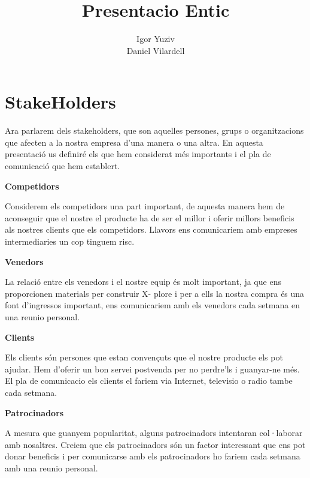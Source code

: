 \documentclass[12pt, a4papre]{article}
\author{Igor Yuziv\\
	   Daniel Vilardell}
\title{\textbf{Presentacio Entic }}
\date{}
\begin{document}
	\maketitle
	

\section{StakeHolders}


Ara parlarem dels stakeholders, que son aquelles persones, grups o organitzacions que afecten a la nostra empresa d'una manera o una altra. En aquesta presentació us definiré els que hem considerat més importants i el pla de comunicació que hem establert.

\textbf{Competidors}


Considerem els competidors una part important, de aquesta manera hem de aconseguir que el nostre el producte ha de ser el millor i oferir millors beneficis als nostres clients que els competidors. Llavors ens comunicariem amb empreses intermediaries un cop tinguem risc.



\textbf{Venedors}


	La relació entre els venedors i el nostre equip és molt important, ja que ens proporcionen materials per construir X-	plore
i per a ells la nostra compra és una font d’ingressos important, ens comunicariem amb els venedors cada setmana en una reunio personal.


\textbf{Clients}


Els clients són persones que estan convençuts que el nostre producte els pot ajudar. 
Hem d’oferir un bon servei postvenda per no perdre’ls i guanyar-ne més. 
El pla de comunicacio els clients el fariem via Internet, televisio o radio tambe cada setmana.

\textbf{Patrocinadors}

A mesura que guanyem popularitat, alguns patrocinadors intentaran col·laborar amb nosaltres. 
 Creiem que els patrocinadors són un factor interessant que ens pot donar
beneficis i per comunicarse amb els patrocinadors ho fariem cada setmana amb una reunio personal.\\\\
\end{document}
